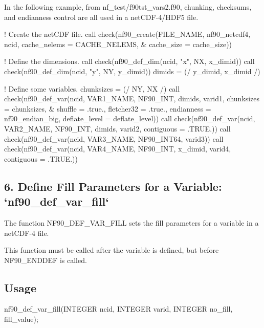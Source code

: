 In the following example, from nf\+\_\+test/f90tst\+\_\+vars2.\+f90, chunking, checksums, and endianness control are all used in a net\+C\+D\+F-\/4/\+H\+D\+F5 file.


\begin{DoxyCode}
\textcolor{comment}{! Create the netCDF file.}
\textcolor{comment}{call check(nf90\_create(FILE\_NAME, nf90\_netcdf4, ncid, cache\_nelems = CACHE\_NELEMS, &}
     cache\_size = cache\_size))

\textcolor{comment}{! Define the dimensions.}
\textcolor{comment}{call check(nf90\_def\_dim(ncid, "x", NX, x\_dimid))}
\textcolor{comment}{call check(nf90\_def\_dim(ncid, "y", NY, y\_dimid))}
dimids =  (/ y\_dimid, x\_dimid /)

\textcolor{comment}{! Define some variables.}
\textcolor{comment}{chunksizes = (/ NY, NX /)}
\textcolor{comment}{call check(nf90\_def\_var(ncid, VAR1\_NAME, NF90\_INT, dimids, varid1, chunksizes = chunksizes, &}
     shuffle = .true., fletcher32 = .true., endianness = nf90\_endian\_big\textcolor{comment}{, deflate\_level = deflate\_level))}
\textcolor{comment}{call check(nf90\_def\_var(ncid, VAR2\_NAME, NF90\_INT, dimids, varid2, contiguous = .TRUE.))}
\textcolor{comment}{call check(nf90\_def\_var(ncid, VAR3\_NAME, NF90\_INT64, varid3))}
\textcolor{comment}{call check(nf90\_def\_var(ncid, VAR4\_NAME, NF90\_INT, x\_dimid, varid4, contiguous = .TRUE.))}
\end{DoxyCode}
\hypertarget{f90-variables_f90-define-fill-parameters-for-a-variable-nf90_def_var_fill}{}\subsection{6. Define Fill Parameters for a Variable\+: `nf90\+\_\+def\+\_\+var\+\_\+fill` }\label{f90-variables_f90-define-fill-parameters-for-a-variable-nf90_def_var_fill}
The function N\+F90\+\_\+\+D\+E\+F\+\_\+\+V\+A\+R\+\_\+\+F\+I\+LL sets the fill parameters for a variable in a net\+C\+D\+F-\/4 file.

This function must be called after the variable is defined, but before N\+F90\+\_\+\+E\+N\+D\+D\+EF is called.

\subsection*{Usage}


\begin{DoxyCode}
nf90\_def\_var\_fill(\textcolor{keywordtype}{INTEGER} ncid, \textcolor{keywordtype}{INTEGER} varid, \textcolor{keywordtype}{INTEGER} no\_fill, fill\_value);
\end{DoxyCode}


